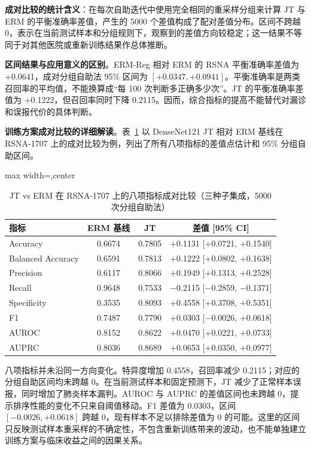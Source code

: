 \documentclass[12pt,a4paper,UTF8,openany]{ctexbook}
\begin{document}
\textbf{成对比较的统计含义}：在每次自助迭代中使用完全相同的重采样分组来计算 JT 与 ERM 的平衡准确率差值，产生的 5000 个差值构成了配对差值分布。区间不跨越 0，表示在当前测试样本和分组规则下，观察到的差值方向较稳定；这一结果不等同于对其他医院或重新训练结果作总体推断。

\textbf{区间结果与应用意义的区别}。ERM-Reg 相对 ERM 的 RSNA 平衡准确率差值为 +0.0641，成对分组自助法 95\% 区间为 $[+0.0347,+0.0941]$。平衡准确率是两类召回率的平均值，不能换算成“每 100 次判断多正确多少次”。JT 的平衡准确率差值为 +0.1222，但召回率同时下降 0.2115。因而，综合指标的提高不能替代对漏诊和误报代价的具体判断。

\textbf{训练方案成对比较的详细解读}。表~\ref{tab:paired_bootstrap_detail} 以 DenseNet121 JT 相对 ERM 基线在 RSNA-1707 上的成对比较为例，列出了所有八项指标的差值点估计和 95\% 分组自助区间。

\begin{table}[htbp]
\centering
\caption{JT vs ERM 在 RSNA-1707 上的八项指标成对比较（三种子集成，5000 次分组自助法）}
\label{tab:paired_bootstrap_detail}
\renewcommand{\arraystretch}{1.25}
\begin{adjustbox}{max width=\textwidth,center}
\begin{tabular}{lccc}
\toprule
\textbf{指标} & \textbf{ERM 基线} & \textbf{JT} & \textbf{差值 [95\% CI]} \\
\midrule
Accuracy & 0.6674 & 0.7805 & +0.1131 [$+$0.0721, $+$0.1540] \\
Balanced Accuracy & 0.6591 & 0.7813 & +0.1222 [$+$0.0802, $+$0.1638] \\
Precision & 0.6117 & 0.8066 & +0.1949 [$+$0.1313, $+$0.2528] \\
Recall & 0.9648 & 0.7533 & $-$0.2115 [$-$0.2859, $-$0.1371] \\
Specificity & 0.3535 & 0.8093 & +0.4558 [$+$0.3708, $+$0.5351] \\
F1 & 0.7487 & 0.7790 & +0.0303 [$-$0.0026, $+$0.0618] \\
AUROC & 0.8152 & 0.8622 & +0.0470 [$+$0.0221, $+$0.0733] \\
AUPRC & 0.8036 & 0.8689 & +0.0653 [$+$0.0350, $+$0.0977] \\
\bottomrule
\end{tabular}
\end{adjustbox}
\end{table}

八项指标并未沿同一方向变化。特异度增加 0.4558，召回率减少 0.2115；对应的分组自助区间均未跨越 0。在当前测试样本和固定预测下，JT 减少了正常样本误报，同时增加了肺炎样本漏判。AUROC 与 AUPRC 的差值区间也未跨越 0，提示排序性能的变化不只来自阈值移动。F1 差值为 0.0303，区间 $[-0.0026, +0.0618]$ 跨越 0，现有样本不足以排除差值为 0 的可能。这里的区间只反映测试样本重采样的不确定性，不包含重新训练带来的波动，也不能单独建立训练方案与临床收益之间的因果关系。
\end{document}

